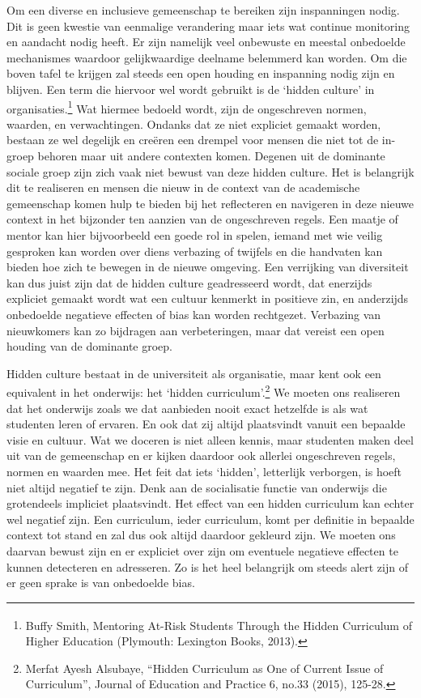 \documentclass[empirical, authordate, ]{new-jote-article}
\begin{document}
	Om een diverse en inclusieve gemeenschap te bereiken zijn inspanningen nodig. Dit is geen kwestie van eenmalige verandering maar iets wat continue monitoring en aandacht nodig heeft. Er zijn namelijk veel onbewuste en meestal onbedoelde mechanismes waardoor gelijkwaardige deelname belemmerd kan worden. Om die boven tafel te krijgen zal steeds een open houding en inspanning nodig zijn en blijven. Een term die hiervoor wel wordt gebruikt is de ‘hidden culture' in organisaties.\footnote{\textsuperscript{ }Buffy Smith, Mentoring At-Risk Students Through the Hidden Curriculum of Higher Education (Plymouth: Lexington Books, 2013).} Wat hiermee bedoeld wordt, zijn de ongeschreven normen, waarden, en verwachtingen. Ondanks dat ze niet expliciet gemaakt worden, bestaan ze wel degelijk en creëren een drempel voor mensen die niet tot de in-groep behoren maar uit andere contexten komen. Degenen uit de dominante sociale groep zijn zich vaak niet bewust van deze hidden culture. Het is belangrijk dit te realiseren en mensen die nieuw in de context van de academische gemeenschap komen hulp te bieden bij het reflecteren en navigeren in deze nieuwe context in het bijzonder ten aanzien van de ongeschreven regels. Een maatje of mentor kan hier bijvoorbeeld een goede rol in spelen, iemand met wie veilig gesproken kan worden over diens verbazing of twijfels en die handvaten kan bieden hoe zich te bewegen in de nieuwe omgeving. Een verrijking van diversiteit kan dus juist zijn dat de hidden culture geadresseerd wordt, dat enerzijds expliciet gemaakt wordt wat een cultuur kenmerkt in positieve zin, en anderzijds onbedoelde negatieve effecten of bias kan worden rechtgezet. Verbazing van nieuwkomers kan zo bijdragen aan verbeteringen, maar dat vereist een open houding van de dominante groep.



	Hidden culture bestaat in de universiteit als organisatie, maar kent ook een equivalent in het onderwijs: het ‘hidden curriculum'.\footnote{Merfat Ayesh Alsubaye, “Hidden Curriculum as One of Current Issue of Curriculum”, Journal of Education and Practice 6, no.33 (2015), 125-28.} We moeten ons realiseren dat het onderwijs zoals we dat aanbieden nooit exact hetzelfde is als wat studenten leren of ervaren. En ook dat zij altijd plaatsvindt vanuit een bepaalde visie en cultuur. Wat we doceren is niet alleen kennis, maar studenten maken deel uit van de gemeenschap en er kijken daardoor ook allerlei ongeschreven regels, normen en waarden mee. Het feit dat iets ‘hidden', letterlijk verborgen, is hoeft niet altijd negatief te zijn. Denk aan de socialisatie functie van onderwijs die grotendeels impliciet plaatsvindt. Het effect van een hidden curriculum kan echter wel negatief zijn. Een curriculum, ieder curriculum, komt per definitie in bepaalde context tot stand en zal dus ook altijd daardoor gekleurd zijn. We moeten ons daarvan bewust zijn en er expliciet over zijn om eventuele negatieve effecten te kunnen detecteren en adresseren. Zo is het heel belangrijk om steeds alert zijn of er geen sprake is van onbedoelde bias.
\end{document}
